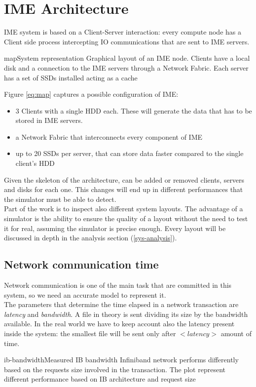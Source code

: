 
\section{IME Architecture}
IME system is based on a Client-Server interaction: every compute node has a
Client side process intercepting IO communications that are sent to IME servers.
\begin{myimage}{map}{System representation}
    Graphical layout of an IME node. Clients have a local disk and a connection
    to the IME servers through a Network Fabric. Each server has a set of SSDs
    installed acting as a cache
\end{myimage}
Figure \ref{eq:map} captures a possible configuration of IME:
\begin{itemize}
    \item 3 Clients with a single HDD each. These will generate the data that
        has to be stored in IME servers.
    \item a Network Fabric that interconnects every component of IME
    \item up to 20 SSDs per server, that can store data faster compared to the single
        client's HDD
\end{itemize}

Given the skeleton of the architecture, can be added or removed clients,
servers and disks for each one. This changes will end up in different performances
that the simulator must be able to detect. \\
Part of the work is to inspect also different system layouts. The advantage of a
simulator is the ability to ensure the quality of a layout without the need to
test it for real, assuming the simulator is precise enough.
Every layout will be discussed in depth in the analysis section
(\ref{sys-analysis}).

\subsection{Network communication time}\label{netbuff}
Network communication is one of the main task that are committed in this system,
so we need an accurate model to represent it. \\
The parameters that determine the time elapsed in a network transaction are
\textit{latency} and \textit{bandwidth}. A file in theory is sent dividing
its size by the bandwidth available. In the real world we have to keep account also
the latency present inside the system: the smallest file will be sent
only after $<latency>$ amount of time. \\
\begin{myimage}{ib-bandwidth}{Measured IB bandwidth}
    Infiniband network performs differently based on the requests size involved
    in the transaction. The plot represent different performance based on IB
    architecture and request size
\end{myimage}

